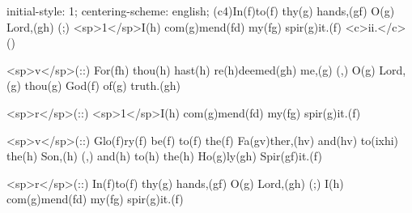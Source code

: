 initial-style: 1;
centering-scheme: english;
(c4)In(f)to(f) thy(g) hands,(gf) O(g) Lord,(gh) (;) <sp>1</sp>I(h) com(g)mend(fd) my(fg) spir(g)it.(f) <c>ii.</c>()

<sp>v</sp>(::) For(fh) thou(h) hast(h) re(h)deemed(gh) me,(g) (,) O(g) Lord,(g) thou(g) God(f) of(g) truth.(gh) 

<sp>r</sp>(::) <sp>1</sp>I(h) com(g)mend(fd) my(fg) spir(g)it.(f) 

<sp>v</sp>(::) Glo(f)ry(f) be(f) to(f) the(f) Fa(gv)ther,(hv) and(hv) to(ixhi) the(h) Son,(h) (,) and(h) to(h) the(h) Ho(g)ly(gh) Spir(gf)it.(f)

<sp>r</sp>(::) In(f)to(f) thy(g) hands,(gf) O(g) Lord,(gh) (;) I(h) com(g)mend(fd) my(fg) spir(g)it.(f) 